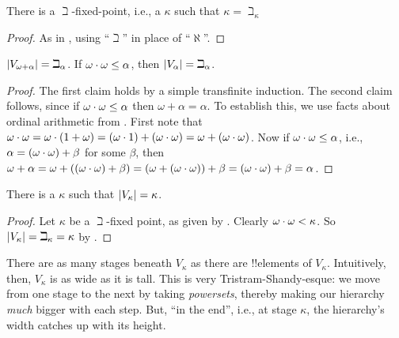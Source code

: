 \documentclass[../../../include/open-logic-section]{subfiles}
\begin{document}
\begin{prop}
There is a $\beth$-fixed-point, i.e., a $\kappa$ such that $\kappa =
\beth_\kappa$
\end{prop}

\begin{proof}
As in , using ``$\beth$'' in place of ``$\aleph$''. 
\end{proof}

\begin{prop}
$\left| V_{\omega+\alpha} \right| = \beth_{\alpha}$. If $\omega \cdot
\omega \leq \alpha$, then $\left| V_\alpha \right| = \beth_\alpha$.
\end{prop}

\begin{proof}
The first claim holds by a simple transfinite induction. The second
claim follows, since if $\omega \cdot \omega \leq \alpha$ then
$\omega + \alpha = \alpha$. To establish this, we use facts about
ordinal arithmetic from . First note
that $\omega \cdot \omega = \omega \cdot (1 + \omega) =
(\omega  \cdot 1) + (\omega\cdot\omega) = \omega
+ (\omega \cdot \omega)$. Now if $\omega \cdot \omega
\leq \alpha$, i.e., $\alpha = (\omega\cdot\omega) + \beta$
for some $\beta$, then $\omega + \alpha = \omega +
((\omega \cdot \omega) + \beta) = (\omega + (\omega
\cdot \omega)) + \beta = (\omega \cdot \omega) +
\beta = \alpha$. 
\end{proof}

\begin{cor}
There is a $\kappa$ such that $\left| V_\kappa \right| = \kappa$.
\end{cor}

\begin{proof}
Let $\kappa$ be a $\beth$-fixed point, as given by .
Clearly $\omega \cdot \omega < \kappa$. So $\left| V_\kappa \right| =
\beth_\kappa = \kappa$ by .
\end{proof}

There are as many stages beneath $V_\kappa$ as there are !!{element}s
of $V_\kappa$. Intuitively, then, $V_\kappa$ is as wide as it is tall.
This is very Tristram-Shandy-esque: we move from one stage to the next
by taking \emph{powersets}, thereby making our hierarchy \emph{much}
bigger with each step. But, ``in the end'', i.e., at stage $\kappa$,
the hierarchy's width catches up with its height. 
\end{document}
